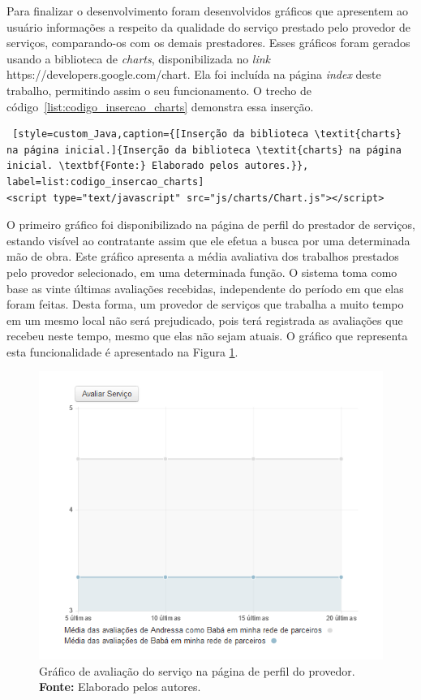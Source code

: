 \par Para finalizar o desenvolvimento foram desenvolvidos gráficos que apresentem ao usuário informações a respeito da qualidade do serviço prestado pelo provedor de serviços, comparando-os com os demais prestadores. Esses gráficos foram gerados usando a biblioteca de \textit{charts}, disponibilizada no \textit{link} https://developers.google.com/chart. Ela foi incluída na página \textit{index} deste trabalho, permitindo assim o seu funcionamento. O trecho de código~\ref{list:codigo_insercao_charts} demonstra essa inserção.

\begin{lstlisting} [style=custom_Java,caption={[Inserção da biblioteca \textit{charts} na página inicial.]{Inserção da biblioteca \textit{charts} na página inicial. \textbf{Fonte:} Elaborado pelos autores.}}, label=list:codigo_insercao_charts] 	
<script type="text/javascript" src="js/charts/Chart.js"></script>
\end{lstlisting}


\par O primeiro gráfico foi disponibilizado na página de perfil do prestador de serviços, estando visível ao contratante assim que ele efetua a busca por uma determinada mão de obra. Este gráfico apresenta a média avaliativa dos trabalhos prestados pelo provedor selecionado, em uma determinada função. O sistema toma como base as vinte últimas avaliações recebidas, independente do período em que elas foram feitas. Desta forma, um provedor de serviços que trabalha a muito tempo em um mesmo local não será prejudicado, pois terá registrada as avaliações que recebeu neste tempo, mesmo que elas não sejam atuais. O gráfico que representa esta funcionalidade é apresentado na Figura \ref{fig:grafico_pagina_perfil}.

\begin{figure}[h!]
	\centerline{\includegraphics[scale=0.65]{./imagens/grafico-pagina-perfil.png}}
	\caption[Gráfico de avaliação do serviço na página de perfil do provedor.]
	{Gráfico de avaliação do serviço na página de perfil do provedor. \textbf{Fonte:} Elaborado pelos autores.}
	\label{fig:grafico_pagina_perfil}
\end{figure}


